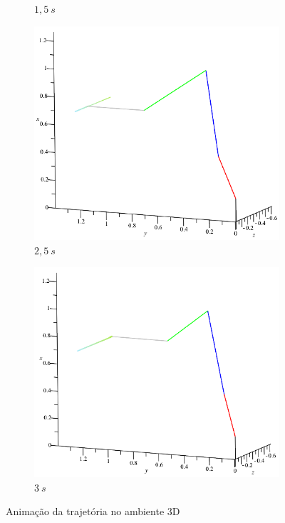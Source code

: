 \begin{figure}[h]
\begin{subfigure}[b]{0.4\textwidth}
        \caption{$1,5~s$}
        \label{fig::mbs3D_1s5}
    \end{subfigure}
    \quad %
    \begin{subfigure}[b]{0.4\textwidth}
        \includegraphics[width=\textwidth]{figs/mbs3D_2s5}
        \caption{$2,5~s$}
        \label{fig::mbs3D_2s5}
    \end{subfigure}
    \quad %
    \begin{subfigure}[b]{0.4\textwidth}
        \includegraphics[width=\textwidth]{figs/mbs3D_3s}
        \caption{$3~s$}
        \label{fig::mbs3D_3s}
    \end{subfigure}
    \caption{Animação da trajetória no ambiente 3D} \label{fig::mbs3D_exemplo}
\end{figure}

